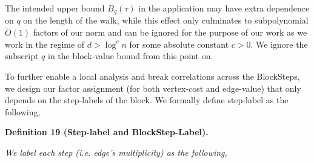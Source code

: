


The intended upper bound $B_{q}(\tau)$ in the application may have extra dependence on $q$ on the length of the walk, while this effect only culminates to subpolynomial $\tilde{O}(1)$ factors of our norm and can be ignored for the purpose of our work as we work in the regime of $d>\log^{c}n$ for some absolute constant $c>0$. We ignore the subscript $q$ in the block-value bound from this point on.\par




To further enable a local analysis and break correlations across the BlockSteps, we design our factor assignment (for both vertex-cost and edge-value) that only depends on the step-labels of the block. We formally define step-label as the following,\par





\par\medskip\noindent\textbf{
\textbf{Definition 19}\textbf{ }(Step-label and BlockStep-Label)\textbf{.}
}\par



\emph{We label each step (i.e. edge’s multiplicity) as the following,}\par


